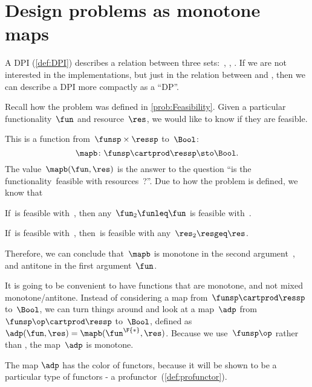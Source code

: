 

\section[DPs as monotone maps]{Design problems as monotone maps}
\label{sec:dpdefinition}



A DPI (\cref{def:DPI}) describes a relation between three sets:~\funsp, \ressp, \impsp.
If we are not interested in the implementations, but just in the relation between \funsp and \ressp, then we can describe a DPI more compactly as a ``DP''\@.

Recall how the problem \Feasibility was defined in \cref{prob:Feasibility}.
Given a particular functionality~$\fun$ and resource~$\res$, we would like to know if they are feasible.

This is a function from~$\funsp \times \ressp$ to~$\Bool$:
%
\begin{equation}
    \mapb\colon \funsp \cartprod \ressp \sto \Bool.
\end{equation}
%
The value~$\mapb(\fun, \res)$ is the answer to the question ``is the functionality~\fun feasible with resources~\res?''.
Due to how the problem is defined, we know that%
\begin{compactenum}
    \item If~\fun is feasible with~\res, then any~$\fun_2 \funleq \fun$ is feasible with~\res.
    \item If~\fun is feasible with~\res, then~\fun is feasible with any~$\res_2 \resgeq \res$.
\end{compactenum}
Therefore, we can conclude that~$\mapb$ is monotone in the second argument~\res, and antitone in the first argument~$\fun$.

It is going to be convenient to have functions that are monotone, and not mixed monotone/antitone.
Instead of considering a map from~$\funsp \cartprod \ressp$ to~$\Bool$, we can turn things around and look at a map~$\adp$ from~$\funsp\op \cartprod \ressp$ to~$\Bool$, defined as~$\adp(\fun,\res) = \mapb(\fun^\F{*},\res)$.
Because we use~$\funsp\op$ rather than \funsp, the map~$\adp$ is monotone.

\begin{remark}[Spoilers]
    The map $\adp$ has the color of functors, because it will be shown to be a particular type of functors - a profunctor~(\cref{def:profunctor}).
\end{remark}


